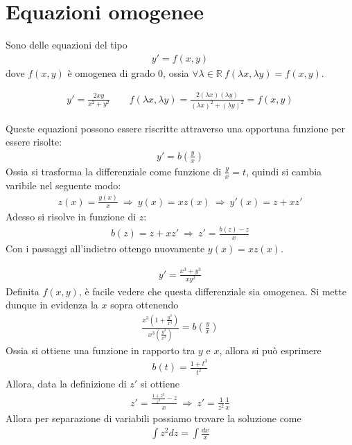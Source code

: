 \documentclass[a4paper, oneside]{book}
\begin{document}
\section{Equazioni omogenee}
Sono delle equazioni del tipo
\begin{gather*}
    y' = f(x, y)
\end{gather*}
dove $f(x, y)$ è omogenea di grado $0$, ossia $\forall \lambda \in \mathbb{R} \ f(\lambda x, \lambda y) = f(x, y)$.
\begin{example}
    \begin{gather*}
        y' = \frac{2xy}{x^{2} + y^{2}  } \qquad f(\lambda x, \lambda y) = \frac{2(\lambda x)(\lambda y)}{(\lambda x)^{2} + (\lambda y)^{2}  } = f(x, y)
    \end{gather*}
\end{example} \noindent
Queste equazioni possono essere riscritte attraverso una opportuna funzione per essere risolte:
\begin{gather*}
    y' = b\left(\frac{y}{x}\right)
\end{gather*}
Ossia si trasforma la differenziale come funzione di $\frac{y}{x} = t$, quindi si cambia varibile
nel seguente modo:
\begin{gather*}
    z(x) = \frac{y(x)}{x} \ \Longrightarrow \ y(x) = xz(x) \ \Longrightarrow \ y'(x) = z + xz'
\end{gather*}
Adesso si risolve in funzione di $z$:
\begin{gather*}
    b(z) = z + xz' \ \Longrightarrow \ z' = \frac{b(z) - z}{x}
\end{gather*}
Con i passaggi all'indietro ottengo nuovamente $y(x) = xz(x)$.
\begin{example}
    \begin{gather*}
        y' = \frac{x^{3} + y^{3}  }{xy^{2} }
    \end{gather*}
    Definita $f(x, y)$, è facile vedere che questa differenziale sia omogenea.
    Si mette dunque in evidenza la $x$ sopra ottenendo
    \begin{gather*}
        \frac{x^{3}(1 + \frac{y^{3} }{x^{3} }) }{x^{3}(\frac{y^{2} }{x^{2} } ) } = b\left(\frac{y}{x}\right) 
    \end{gather*}
    Ossia si ottiene una funzione in rapporto tra $y$ e $x$, allora si può esprimere
    \begin{gather*}
        b(t) = \frac{1 + t^{3} }{t^{2} }
    \end{gather*}
    Allora, data la definizione di $z'$ si ottiene
    \begin{gather*}
        z' = \frac{\frac{1 + z^{3} }{z^{2} } - z}{x} \ \Longrightarrow \ z' = \frac{1}{z^{2} }\frac{1}{x}
    \end{gather*}
    Allora per separazione di variabili possiamo trovare la soluzione come
    \begin{gather*}
        \int z^{2} dz  = \int \frac{dx}{x}
    \end{gather*}
\end{example}
\end{document}
